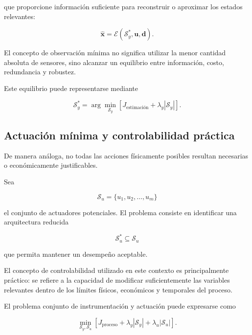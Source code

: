 que proporcione información suficiente para reconstruir o aproximar los estados relevantes:

\begin{equation}
\hat{\mathbf{x}}
=
\mathcal{E}
\left(
\mathcal{S}_y^{*},
\mathbf{u},
\mathbf{d}
\right).
\end{equation}

El concepto de observación mínima no significa utilizar la menor cantidad absoluta de sensores, sino alcanzar un equilibrio entre información, costo, redundancia y robustez.

Este equilibrio puede representarse mediante

\begin{equation}
\boxed{
\mathcal{S}_y^{*}
=
\arg\min_{\mathcal{S}_y}
\left[
J_{\mathrm{estimación}}
+
\lambda_y
\left|
\mathcal{S}_y
\right|
\right].
}
\label{eq:seleccion_sensores}
\end{equation}

\subsection{Actuación mínima y controlabilidad práctica}
\label{subsec:actuacion_minima}

De manera análoga, no todas las acciones físicamente posibles resultan necesarias o económicamente justificables.

Sea

\begin{equation}
\mathcal{S}_u
=
\{u_1,u_2,\ldots,u_m\}
\end{equation}

el conjunto de actuadores potenciales. El problema consiste en identificar una arquitectura reducida

\begin{equation}
\mathcal{S}_u^{*}
\subseteq
\mathcal{S}_u
\end{equation}

que permita mantener un desempeño aceptable.

El concepto de controlabilidad utilizado en este contexto es principalmente práctico: se refiere a la capacidad de modificar suficientemente las variables relevantes dentro de los límites físicos, económicos y temporales del proceso.

El problema conjunto de instrumentación y actuación puede expresarse como

\begin{equation}
\boxed{
\min_{\mathcal{S}_y,\mathcal{S}_u}
\left[
J_{\mathrm{proceso}}
+
\lambda_y|\mathcal{S}_y|
+
\lambda_u|\mathcal{S}_u|
\right].
}
\label{eq:arquitectura_minima}
\end{equation}

